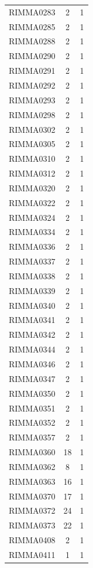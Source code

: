 \documentclass[11pt]{article}
\begin{document}
\begin{linenumbers}
\begin{flushleft}
\begin{table}[htbp]
\begin{tabular}{ccc}
    RIMMA0283 & 2     & 1 \\
    RIMMA0285 & 2     & 1 \\
    RIMMA0288 & 2     & 1 \\
    RIMMA0290 & 2     & 1 \\
    RIMMA0291 & 2     & 1 \\
    RIMMA0292 & 2     & 1 \\
    RIMMA0293 & 2     & 1 \\
    RIMMA0298 & 2     & 1 \\
    RIMMA0302 & 2     & 1 \\
    RIMMA0305 & 2     & 1 \\
    RIMMA0310 & 2     & 1 \\
    RIMMA0312 & 2     & 1 \\
    RIMMA0320 & 2     & 1 \\
    RIMMA0322 & 2     & 1 \\
    RIMMA0324 & 2     & 1 \\
    RIMMA0334 & 2     & 1 \\
    RIMMA0336 & 2     & 1 \\
    RIMMA0337 & 2     & 1 \\
    RIMMA0338 & 2     & 1 \\
    RIMMA0339 & 2     & 1 \\
    RIMMA0340 & 2     & 1 \\
    RIMMA0341 & 2     & 1 \\
    RIMMA0342 & 2     & 1 \\
    RIMMA0344 & 2     & 1 \\
    RIMMA0346 & 2     & 1 \\
    RIMMA0347 & 2     & 1 \\
    RIMMA0350 & 2     & 1 \\
    RIMMA0351 & 2     & 1 \\
    RIMMA0352 & 2     & 1 \\
    RIMMA0357 & 2     & 1 \\
    RIMMA0360 & 18    & 1 \\
    RIMMA0362 & 8     & 1 \\
    RIMMA0363 & 16    & 1 \\
    RIMMA0370 & 17    & 1 \\
    RIMMA0372 & 24    & 1 \\
    RIMMA0373 & 22    & 1 \\
    RIMMA0408 & 2     & 1 \\
    RIMMA0411 & 1     & 1 \\

\end{tabular}
\end{table}
\end{flushleft}
\end{linenumbers}
\end{document}
